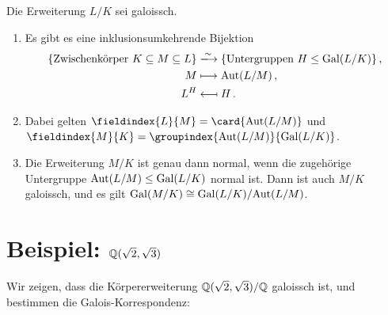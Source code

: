 \begin{theorem}
  Die Erweiterung $L/K$ sei galoissch.
  \begin{enumerate}
    \item
      Es gibt es eine inklusionsumkehrende Bijektion
      \begin{align*}
                                \{ \text{Zwischenkörper $K \subseteq M \subseteq L$} \}
        &\xlongrightarrow{\sim} \{ \text{Untergruppen $H \subgroup \Gal{L/K}$} \} \,, \\
                                M
        &\longmapsto            \Aut{L/M} \,, \\
                                L^H
        &\longmapsfrom          H \,.
      \end{align*}
    \item
      Dabei gelten $\fieldindex{L}{M} = \card{\Aut{L/M}}$ und $\fieldindex{M}{K} = \groupindex{\Aut{L/M}}{\Gal{L/K}}$.
    \item
      Die Erweiterung $M/K$ ist genau dann normal, wenn die zugehörige Untergruppe $\operatorname{Aut}(L/M) \mathrel{\leq} \operatorname{Gal}(L/K)$ normal ist.
      Dann ist auch $M/K$ galoissch, und es gilt $\operatorname{Gal}(M/K) \cong \operatorname{Gal}(L/K) / {\operatorname{Aut}(L/M)}$.
  \end{enumerate}
\end{theorem}





\section{Beispiel: \texorpdfstring{$\mathbb{Q}(\sqrt{2}, \sqrt{3})$}{Q(sqrt(2),sqrt(3))}}

Wir zeigen, dass die Körpererweiterung $\mathbb{Q}(\sqrt{2}, \sqrt{3}) / \mathbb{Q}$ galoissch ist, und bestimmen die Galois-Korrespondenz:


